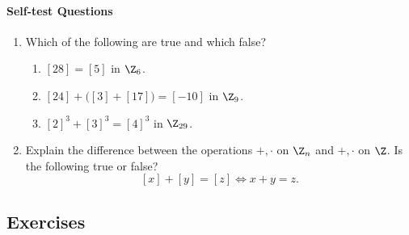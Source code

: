\paragraph{Self-test Questions}

\begin{enumerate}
  \item Which of the following are true and which false?
  \begin{enumerate}
    \item $[28]=[5]$ in $\Z_6$.
    \item $[24]+\big([3]+[17]\big)=[-10]$ in $\Z_9$.
    \item $[2]^3+[3]^3=[4]^3$ in $\Z_{29}$.
	\end{enumerate}
	\item Explain the difference between the operations $+,\cdot$ on $\Z_n$ and $+,\cdot$ on $\Z$. Is the following true or false?
	\[[x]+[y]=[z]\iff x+y=z.\]
\end{enumerate}

\subsection*{Exercises}

